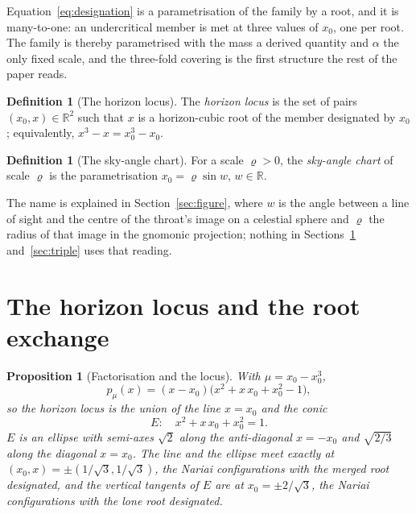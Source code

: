 \documentclass[11pt]{article}
\theoremstyle{plain}
\newtheorem{proposition}[theorem]{Proposition}
\theoremstyle{definition}
\newtheorem{definition}[theorem]{Definition}
\theoremstyle{remark}
\begin{document}
Equation~\eqref{eq:designation} is a parametrisation of the family by a root, and it is many-to-one: an
undercritical member is met at three values of $x_{0}$, one per root. The family is thereby parametrised with
the mass a derived quantity and $\alpha$ the only fixed scale, and the three-fold covering is the first
structure the rest of the paper reads.

\begin{definition}[The horizon locus]\label{def:locus}
The \emph{horizon locus} is the set of pairs $(x_{0},x)\in\mathbb{R}^{2}$ such that $x$ is a horizon-cubic root of
the member designated by $x_{0}$; equivalently, $x^{3}-x=x_{0}^{3}-x_{0}$.
\end{definition}

\begin{definition}[The sky-angle chart]\label{def:chart}
For a scale $\varrho>0$, the \emph{sky-angle chart} of scale $\varrho$ is the parametrisation
$x_{0}=\varrho\sin w$, $w\in\mathbb{R}$.
\end{definition}

The name is explained in Section~\ref{sec:figure}, where $w$ is the angle between a line of sight and the centre
of the throat's image on a celestial sphere and $\varrho$ the radius of that image in the gnomonic projection;
nothing in Sections~\ref{sec:locus} and~\ref{sec:triple} uses that reading.

\section{The horizon locus and the root exchange}\label{sec:locus}

\begin{proposition}[Factorisation and the locus]\label{prop:locus}
With $\mu=x_{0}-x_{0}^{3}$,
\begin{equation}\label{eq:factor}
p_{\mu}(x)=(x-x_{0})\bigl(x^{2}+x\,x_{0}+x_{0}^{2}-1\bigr),
\end{equation}
so the horizon locus is the union of the line $x=x_{0}$ and the conic
\begin{equation}\label{eq:ellipse}
E:\quad x^{2}+x\,x_{0}+x_{0}^{2}=1 .
\end{equation}
$E$ is an ellipse with semi-axes $\sqrt2$ along the anti-diagonal $x=-x_{0}$ and $\sqrt{2/3}$ along the diagonal
$x=x_{0}$. The line and the ellipse meet exactly at $(x_{0},x)=\pm(1/\sqrt3,1/\sqrt3)$, the Nariai
configurations with the merged root designated, and the vertical tangents of $E$ are at $x_{0}=\pm2/\sqrt3$, the
Nariai configurations with the lone root designated.
\end{proposition}
\end{document}
